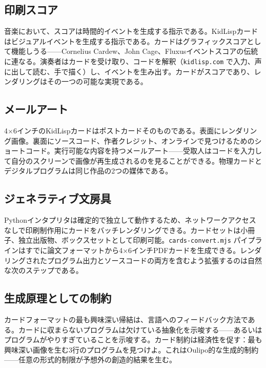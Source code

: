 \documentclass[10pt,letterpaper,twocolumn]{article}
\begin{document}
\subsection{印刷スコア}

音楽において、スコアは時間的イベントを生成する指示である。KidLispカードはビジュアルイベントを生成する指示である。カードはグラフィックスコアとして機能しうる——Cornelius Cardew、John Cage、Fluxusイベントスコアの伝統に連なる。演奏者はカードを受け取り、コードを解釈（\texttt{kidlisp.com} で入力、声に出して読む、手で描く）し、イベントを生み出す。カードがスコアであり、レンダリングはその一つの可能な実現である。

\subsection{メールアート}

4$\times$6インチのKidLispカードはポストカードそのものである。表面にレンダリング画像。裏面にソースコード、作者クレジット、オンラインで見つけるためのショートコード。実行可能な内容を持つメールアート——受取人はコードを入力して自分のスクリーンで画像が再生成されるのを見ることができる。物理カードとデジタルプログラムは同じ作品の2つの媒体である。

\subsection{ジェネラティブ文房具}

Pythonインタプリタは確定的で独立して動作するため、ネットワークアクセスなしで印刷制作用にカードをバッチレンダリングできる。カードセットは小冊子、独立出版物、ボックスセットとして印刷可能。\texttt{cards-convert.mjs} パイプラインはすでに論文フォーマットから4$\times$6インチPDFカードを生成できる。レンダリングされたプログラム出力とソースコードの両方を含むよう拡張するのは自然な次のステップである。

\subsection{生成原理としての制約}

カードフォーマットの最も興味深い帰結は、言語へのフィードバック方法である。カードに収まらないプログラムは欠けている抽象化を示唆する——あるいはプログラムがやりすぎていることを示唆する。カード制約は経済性を促す：最も興味深い画像を生む3行のプログラムを見つけよ。これはOulipo的な生成的制約——任意の形式的制限が予想外の創造的結果を生む。

\end{document}
